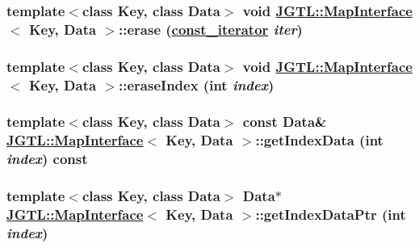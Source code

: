 \hypertarget{class_j_g_t_l_1_1_map_interface_7fe23525fa2fca5e47cb047332fb49d3}{
\subsubsection[erase]{\setlength{\rightskip}{0pt plus 5cm}template$<$class Key, class Data$>$ void \hyperlink{class_j_g_t_l_1_1_map_interface}{JGTL::Map\-Interface}$<$ Key, Data $>$::erase (\hyperlink{class_j_g_t_l_1_1_map_interface_bbce6cc516069a5a504e0ae5b9aecd88}{const\_\-iterator} {\em iter})}}
\label{class_j_g_t_l_1_1_map_interface_7fe23525fa2fca5e47cb047332fb49d3}


\hypertarget{class_j_g_t_l_1_1_map_interface_8b9cf8f1daa77edaf645c22f81812fcf}{
\subsubsection[eraseIndex]{\setlength{\rightskip}{0pt plus 5cm}template$<$class Key, class Data$>$ void \hyperlink{class_j_g_t_l_1_1_map_interface}{JGTL::Map\-Interface}$<$ Key, Data $>$::erase\-Index (int {\em index})}}
\label{class_j_g_t_l_1_1_map_interface_8b9cf8f1daa77edaf645c22f81812fcf}


\hypertarget{class_j_g_t_l_1_1_map_interface_3bd1eca8bba2b057e09eb6579e26ad8f}{
\subsubsection[getIndexData]{\setlength{\rightskip}{0pt plus 5cm}template$<$class Key, class Data$>$ const Data\& \hyperlink{class_j_g_t_l_1_1_map_interface}{JGTL::Map\-Interface}$<$ Key, Data $>$::get\-Index\-Data (int {\em index}) const}}
\label{class_j_g_t_l_1_1_map_interface_3bd1eca8bba2b057e09eb6579e26ad8f}


\hypertarget{class_j_g_t_l_1_1_map_interface_e2b0ad1f3959cf7f8d1c6ef07c5a8c2c}{
\subsubsection[getIndexDataPtr]{\setlength{\rightskip}{0pt plus 5cm}template$<$class Key, class Data$>$ Data$\ast$ \hyperlink{class_j_g_t_l_1_1_map_interface}{JGTL::Map\-Interface}$<$ Key, Data $>$::get\-Index\-Data\-Ptr (int {\em index})}}
\label{class_j_g_t_l_1_1_map_interface_e2b0ad1f3959cf7f8d1c6ef07c5a8c2c}


